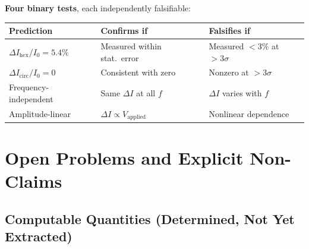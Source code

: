 \documentclass[12pt,a4paper]{article}
\theoremstyle{plain}
\theoremstyle{definition}
\begin{document}
\textbf{Four binary tests}, each independently falsifiable:
\begin{center}
\begin{tabular}{lll}
\toprule
\textbf{Prediction} & \textbf{Confirms if} & \textbf{Falsifies if} \\
\midrule
$\Delta I_{\mathrm{hex}}/I_0 = 5.4\%$ & Measured within stat.\ error & Measured $< 3\%$ at $>3\sigma$ \\
$\Delta I_{\mathrm{circ}}/I_0 = 0$ & Consistent with zero & Nonzero at $>3\sigma$ \\
Frequency-independent & Same $\Delta I$ at all $f$ & $\Delta I$ varies with $f$ \\
Amplitude-linear & $\Delta I \propto V_{\mathrm{applied}}$ & Nonlinear dependence \\
\bottomrule
\end{tabular}
\end{center}

\section{Open Problems and Explicit Non-Claims}\label{sec:open}

\subsection{Computable Quantities (Determined, Not Yet Extracted)}
\end{document}
